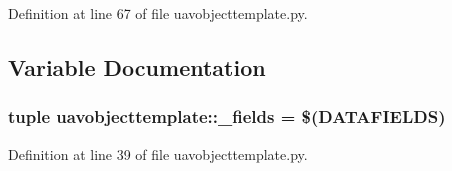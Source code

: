 \-Definition at line 67 of file uavobjecttemplate.\-py.



\subsection{\-Variable \-Documentation}
\hypertarget{namespaceuavobjecttemplate_a133640537f2ef43b12406e848ea1dbef}{
\subsubsection[{\-\_\-fields}]{\setlength{\rightskip}{0pt plus 5cm}tuple {\bf uavobjecttemplate\-::\-\_\-fields} = \$(\-D\-A\-T\-A\-F\-I\-E\-L\-D\-S)}}\label{namespaceuavobjecttemplate_a133640537f2ef43b12406e848ea1dbef}


\-Definition at line 39 of file uavobjecttemplate.\-py.

